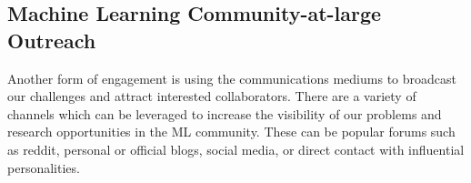 

\subsection{Machine Learning Community-at-large Outreach}
Another form of engagement is using the communications mediums to broadcast our challenges and attract interested collaborators. There are a variety of channels which can be leveraged to increase the visibility of our problems and research opportunities in the ML community. These can be popular forums such as reddit, personal or official blogs, social media, or direct contact with influential personalities.

